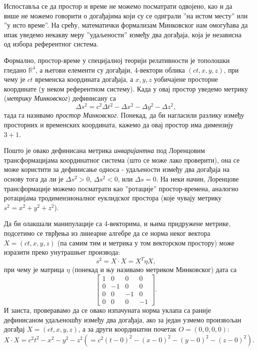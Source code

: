 \documentclass{report}
\theoremstyle{plain}
\theoremstyle{definition}
\begin{document}
Испоставља се да простор и време не можемо посматрати одвојено, као и да више не можемо говорити о догађајима који су се одиграли ''на истом месту'' или ''у исто време''. На срећу, математички формализам Минковског нам омогућава да ипак уведемо некакву меру ''удаљености'' између два догађаја, која је независна од избора референтног система.

Формално, простор-време у специјалној теорији релативности је тополошки гледано $\mathbb{R}^4$, а његови елементи су догађаји, 4-вектори облика $(ct, x, y, z)$, при чему је $ct$ временска координата догађаја, а $x, y, z$ уобичајене просторне координате (у неком референтном систему). Када у овај простор уведемо метрику (\emph{метрику Минковског}) дефинисану са
$$\Delta s^2 = c^2\Delta t^2 - \Delta x^2 - \Delta y^2 - \Delta z^2,$$
тада га називамо \emph{простор Минковског}. Понекад, да би нагласили разлику између просторних и временских координата, кажемо да овај простор има димензију $3+1$.

Пошто је овако дефинисана метрика \emph{инваријантна} под Лоренцовим трансформацијама координатног система (што се може лако проверити), она се може користити за дефинисање односа - удаљености између два догађаја на основу тога да ли је $\Delta s^2>0$, $\Delta s^2 <0$, или $\Delta s = 0$. На неки начин, Лоренцове трансформације можемо посматрати као ''ротације'' простор-времена, аналогно ротацијама тродимензионалног еуклидског простора (које чувају метрику $s^2 = x^2+y^2+z^2$).

Да би олакшали манипулације са 4-векторима, и њима придружене метрике, подсетимо се тврђења из линеарне алгебре да се норма неког вектора $X = (ct, x, y, z)$ (па самим тим и метрика у том векторском простору) може изразити преко унутрашњег производа:
$$s^2 = X\cdot X = X^T\eta X,$$
при чему је матрица $\eta$ (понекад и њу називамо метриком Минковског) дата са
$$\begin{bmatrix}
    1 &  0 &  0 &  0\\
    0 & -1 &  0 &  0\\
    0 &  0 & -1 &  0\\
    0 &  0 &  0 & -1
  \end{bmatrix}.$$
И заиста, проверавамо да се овако изпачуната норма уклапа са раније дефинисаном удаљеношћу између два догађаја, ако за један узмемо произвољан догађај $X = (ct, x, y, z)$, а за други координатни почетак $O = (0, 0, 0, 0)$:
$$X\cdot X = c^2t^2 - x^2 - y^2 - z^2 (= c^2(t-0)^2 - (x-0)^2 - (y-0)^2 - (z-0)^2).$$
\end{document}
